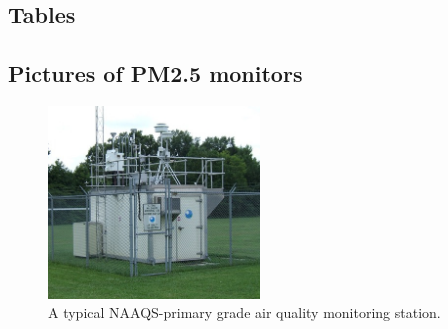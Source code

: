 \documentclass[12pt]{article}
\begin{document}
\newpage
\subsection{Tables}
\label{sec:tables}






\newpage

% 















\newpage







\newpage
\subsection{Pictures of PM2.5 monitors}
\label{sec:monitor_pictures}

\begin{figure}[h!]
\centering
\includegraphics[width=0.5\textwidth]{appendix/sensor_pics/air-monitoring-site.jpg}
\caption{A typical NAAQS-primary grade air quality monitoring station.}
\label{fig:pic-epa-site}
\end{figure}
\end{document}

